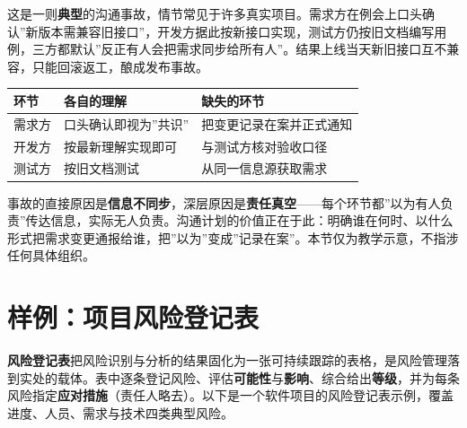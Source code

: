\documentclass[
]{ctexbook}
\newcounter{none}
\begin{document}
这是一则\textbf{典型}的沟通事故，情节常见于许多真实项目。需求方在例会上口头确认''新版本需兼容旧接口''，开发方据此按新接口实现，测试方仍按旧文档编写用例，三方都默认''反正有人会把需求同步给所有人''。结果上线当天新旧接口互不兼容，只能回滚返工，酿成发布事故。

{\def\LTcaptype{none} %
\begin{longtable}[]{@{}lll@{}}
\toprule\noalign{}
环节 & 各自的理解 & 缺失的环节 \\
\midrule\noalign{}
\endhead
\bottomrule\noalign{}
\endlastfoot
需求方 & 口头确认即视为''共识'' & 把变更记录在案并正式通知 \\
开发方 & 按最新理解实现即可 & 与测试方核对验收口径 \\
测试方 & 按旧文档测试 & 从同一信息源获取需求 \\
\end{longtable}
}

事故的直接原因是\textbf{信息不同步}，深层原因是\textbf{责任真空}------每个环节都''以为有人负责''传达信息，实际无人负责。沟通计划的价值正在于此：明确谁在何时、以什么形式把需求变更通报给谁，把''以为''变成''记录在案''。本节仅为教学示意，不指涉任何具体组织。

\section{样例：项目风险登记表}\label{ux6837ux4f8bux9879ux76eeux98ceux9669ux767bux8bb0ux8868}

\textbf{风险登记表}把风险识别与分析的结果固化为一张可持续跟踪的表格，是风险管理落到实处的载体。表中逐条登记风险、评估\textbf{可能性}与\textbf{影响}、综合给出\textbf{等级}，并为每条风险指定\textbf{应对措施}（责任人略去）。以下是一个软件项目的风险登记表示例，覆盖进度、人员、需求与技术四类典型风险。
\end{document}
